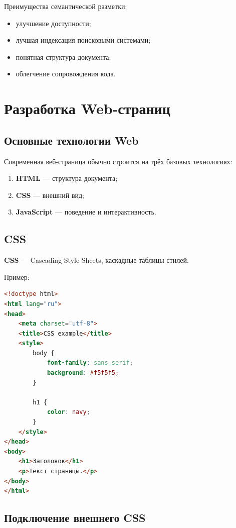 \documentclass[12pt,a4paper]{article}
\begin{document}
Преимущества семантической разметки:
\begin{itemize}
    \item улучшение доступности;
    \item лучшая индексация поисковыми системами;
    \item понятная структура документа;
    \item облегчение сопровождения кода.
\end{itemize}

\section{Разработка Web-страниц}

\subsection{Основные технологии Web}

Современная веб-страница обычно строится на трёх базовых технологиях:
\begin{enumerate}
    \item \textbf{HTML} --- структура документа;
    \item \textbf{CSS} --- внешний вид;
    \item \textbf{JavaScript} --- поведение и интерактивность.
\end{enumerate}

\subsection{CSS}

\textbf{CSS} --- Cascading Style Sheets, каскадные таблицы стилей.

Пример:
\begin{lstlisting}[language=HTML]
<!doctype html>
<html lang="ru">
<head>
    <meta charset="utf-8">
    <title>CSS example</title>
    <style>
        body {
            font-family: sans-serif;
            background: #f5f5f5;
        }

        h1 {
            color: navy;
        }
    </style>
</head>
<body>
    <h1>Заголовок</h1>
    <p>Текст страницы.</p>
</body>
</html>
\end{lstlisting}

\subsection{Подключение внешнего CSS}
\end{document}
